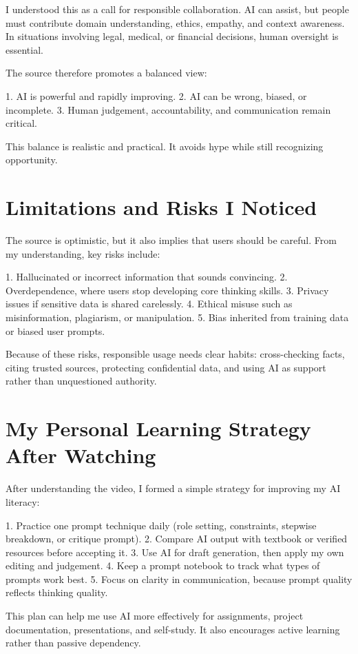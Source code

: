 \documentclass[12pt,a4paper]{article}
\begin{document}
I understood this as a call for responsible collaboration. AI can assist, but people must contribute domain understanding, ethics, empathy, and context awareness. In situations involving legal, medical, or financial decisions, human oversight is essential.

The source therefore promotes a balanced view:

1. AI is powerful and rapidly improving.
2. AI can be wrong, biased, or incomplete.
3. Human judgement, accountability, and communication remain critical.

This balance is realistic and practical. It avoids hype while still recognizing opportunity.

\section*{Limitations and Risks I Noticed}
The source is optimistic, but it also implies that users should be careful. From my understanding, key risks include:

1. Hallucinated or incorrect information that sounds convincing.
2. Overdependence, where users stop developing core thinking skills.
3. Privacy issues if sensitive data is shared carelessly.
4. Ethical misuse such as misinformation, plagiarism, or manipulation.
5. Bias inherited from training data or biased user prompts.

Because of these risks, responsible usage needs clear habits: cross-checking facts, citing trusted sources, protecting confidential data, and using AI as support rather than unquestioned authority.

\section*{My Personal Learning Strategy After Watching}
After understanding the video, I formed a simple strategy for improving my AI literacy:

1. Practice one prompt technique daily (role setting, constraints, stepwise breakdown, or critique prompt).
2. Compare AI output with textbook or verified resources before accepting it.
3. Use AI for draft generation, then apply my own editing and judgement.
4. Keep a prompt notebook to track what types of prompts work best.
5. Focus on clarity in communication, because prompt quality reflects thinking quality.

This plan can help me use AI more effectively for assignments, project documentation, presentations, and self-study. It also encourages active learning rather than passive dependency.
\end{document}
